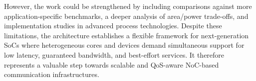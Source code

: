 However, the work could be strengthened by including comparisons against more application-specific benchmarks, a deeper analysis of area/power trade-offs, and implementation studies in advanced process technologies.  
Despite these limitations, the architecture establishes a flexible framework for next-generation SoCs where heterogeneous cores and devices demand simultaneous support for low latency, guaranteed bandwidth, and best-effort services. It therefore represents a valuable step towards scalable and QoS-aware NoC-based communication infrastructures.
